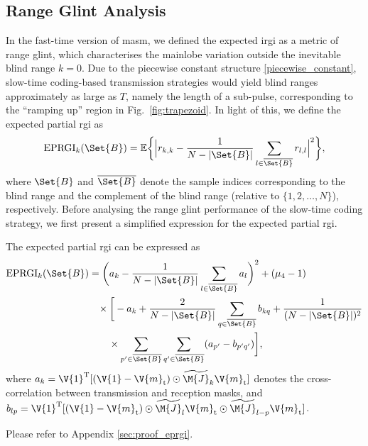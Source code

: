 \documentclass[journal,a4paper,10pt, romanappendices]{IEEEtran}
\begin{document}
\subsection{Range Glint Analysis}
In the fast-time version of \ac{masm}, we defined the expected \ac{irgi} as a metric of range glint, which characterises the mainlobe variation outside the inevitable blind range $k=0$. Due to the piecewise constant structure \eqref{piecewise_constant}, slow-time coding-based transmission strategies would yield blind ranges approximately as large as $T$, namely the length of a sub-pulse, corresponding to the ``ramping up'' region in Fig.~\ref{fig:trapezoid}. In light of this, we define the expected partial \ac{rgi} as
\begin{equation}
{\rm EPRGI}_k(\Set{B}) = \mathbb{E}\bigg\{\Big|r_{k,k}-\frac{1}{N-|\Set{B}|}\sum_{l\in\overline{\Set{B}}}r_{l,l}\Big|^2\bigg\},
\end{equation}
where $\Set{B}$ and $\overline{\Set{B}}$ denote the sample indices corresponding to the blind range and the complement of the blind range (relative to $\{1,2,\dotsc,N\}$), respectively. Before analysing the range glint performance of the slow-time coding strategy, we first present a simplified expression for the expected partial \ac{rgi}.
\begin{lemma}\label{lem:eprgi}
The expected partial \ac{rgi} can be expressed as
\begin{align}\label{eprgi_full}
{\rm EPRGI}_k(\Set{B}) &= \bigg(a_k-\frac{1}{N-|\Set{B}|}\sum_{l\in\overline{\Set{B}}}a_l\bigg)^2+ (\mu_4-1) \nonumber\\
&\hspace{3mm}\times \bigg[-a_k+\frac{2}{N-|\Set{B}|}\sum_{q\in\overline{\Set{B}}}b_{kq}+\frac{1}{(N-|\Set{B}|)^2} \nonumber \\
&\hspace{7mm}\times \sum_{p^\prime\in\overline{\Set{B}}}\sum_{q^\prime\in\overline{\Set{B}}}(a_{p^\prime}-b_{p^\prime q^\prime})\bigg],
\end{align}
where $a_k = \V{1}^{\rm T}[(\V{1}-\V{m}_{\rm t})\odot \widetilde{\M{J}}_k\V{m}_{\rm t}]$ denotes the cross-correlation between transmission and reception masks, and $b_{lp} = \V{1}^{\rm T}[(\V{1}-\V{m}_{\rm t})\odot \widetilde{\M{J}}_l\V{m}_{\rm t}\odot \widetilde{\M{J}}_{l-p}\V{m}_{\rm t}]$.
\begin{IEEEproof}
Please refer to Appendix \ref{sec:proof_eprgi}.
\end{IEEEproof}
\end{lemma}
\end{document}
